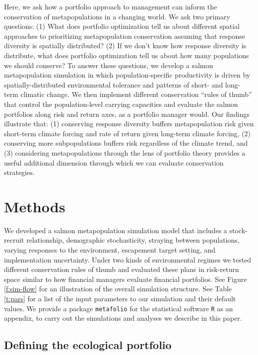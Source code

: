 Here, we ask how a portfolio approach to management can inform the conservation of metapopulations in a changing world. We ask two primary questions: (1) What does portfolio optimization tell us about different spatial approaches to prioritizing metapopulation conservation assuming that response diversity is spatially distributed? (2) If we don't know how response diversity is distribute, what does portfolio optimization tell us about how many populations we should conserve? To answer these questions, we develop a salmon metapopulation simulation in which population-specific productivity is driven by spatially-distributed environmental tolerance and patterns of short- and long-term climatic change. We then implement different conservation ``rules of thumb'' that control the population-level carrying capacities and evaluate the salmon portfolios along risk and return axes, as a portfolio manager would. Our findings illustrate that: (1) conserving response diversity buffers metapopulation risk given short-term climate forcing and rate of return given long-term climate forcing, (2) conserving more subpopulations buffers risk regardless of the climate trend, and (3) considering metapopulations through the lens of portfolio theory provides a useful additional dimension through which we can evaluate conservation strategies.

\section{Methods}

We developed a salmon metapopulation simulation model that includes a stock-recruit relationship, demographic stochasticity, straying between populations, varying responses to the environment, escapement target setting, and implementation uncertainty. Under two kinds of environmental regimes we tested different conservation rules of thumb and evaluated these plans in risk-return space similar to how financial managers evaluate financial portfolios. See Figure \ref{f:sim-flow} for an illustration of the overall simulation structure. See Table \ref{t:pars} for a list of the input parameters to our simulation and their default values. We provide a package \texttt{metafolio} for the statistical software \texttt{R} \citep{r2013} as an appendix, to carry out the simulations and analyses we describe in this paper.

\subsection{Defining the ecological portfolio}

